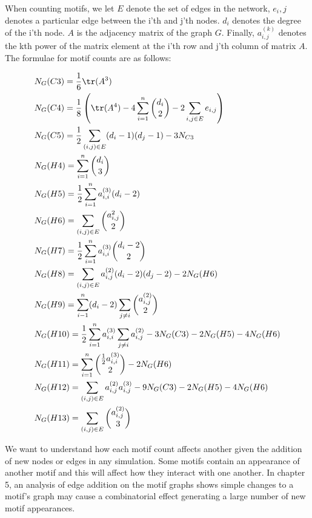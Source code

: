 When counting motifs, we let $E$ denote the set of edges in the network, $e_i,j$ denotes a particular edge between the 
i'th and j'th nodes. $d_i$ denotes the degree of the i'th node. $A$ is the adjacency matrix of the
 graph $G$. Finally, $a^{(k)}_{i,j}$ denotes the kth power of the matrix 
element at the i'th row and j'th column of matrix $A$. The formulae for motif counts are as follows:

\newpage

\begin{align*}
    &N_G(C3) = \frac{1}{6} \tr({A^3}) \\
    &N_G(C4) = \frac{1}{8} \left(\tr(A^4) -4\sum^{n}_{i=1} {d_i \choose 2} - 2\sum_{i,j \in E} e_{i,j} \right)\\
    &N_G(C5) = \frac{1}{2}\sum_{(i,j)\in E} (d_i - 1)(d_j - 1) - 3 N_{C3} \\
    &N_G(H4) = \sum^{n}_{i=1} {d_i \choose 3} \\
    &N_G(H5) = \frac{1}{2} \sum^{n}_{i=1} a^{(3)}_{i,i} (d_i-2)\\
    &N_G(H6)= \sum_{(i,j)\in E}{a^{2}_{i,j} \choose 2 }\\
    &N_G(H7) = \frac{1}{2} \sum^{n}_{i=1} a^{(3)}_{i,i} {{d_i-2} \choose 2}\\
    &N_G(H8)= \sum_{(i,j)\in E} a^{(2)}_{i,j} (d_i-2)(d_j-2) - 2 N_G(H6)\\
    &N_G(H9) = \sum^{n}_{i-1}(d_i-2) \sum_{j \neq i} {a^{(2)}_{i,j} \choose 2 }\\
    &N_G(H10) = \frac{1}{2}\sum^{n}_{i=1}a^{(3)}_{i,i} \sum_{j \neq i} a^{(2)}_{i,j} - 3 N_G(C3)- 2N_G(H5) -4N_G(H6)\\
    &N_G(H11) = \sum^{n}_{i=1} {\frac{1}{2}a^{(3)}_{i,i} \choose 2} - 2N_G(H6)\\
    &N_G(H12) = \sum_{(i,j)\in E} a^{(2)}_{i,j} a^{(3)}_{i,j} - 9N_G(C3) -2N_G(H5)-4N_G(H6)\\
    &N_G(H13) = \sum_{(i,j)\in E} {a^{(2)}_{i,j} \choose 3}\\
\end{align*}

We want to understand how each motif count affects another given the addition of new nodes or edges
in any simulation. Some motifs contain an appearance of another motif and this will affect how they interact with one another. In chapter 5, 
an analysis of edge addition on the motif graphs shows simple changes
to a motif's graph may cause a combinatorial effect generating a large number of new motif appearances.

